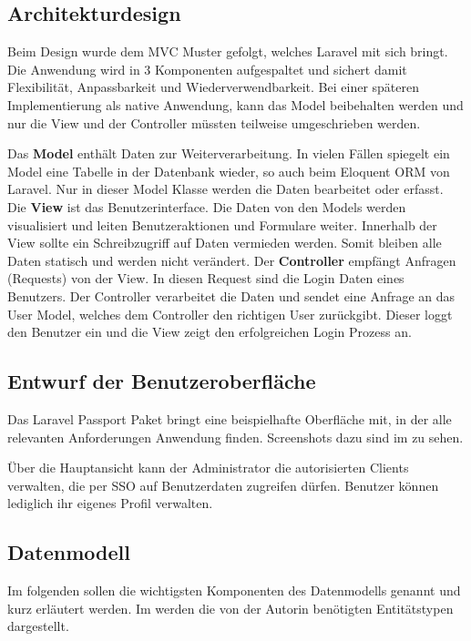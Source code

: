 \subsection{Architekturdesign}
\label{sec:Architekturdesign}

Beim Design wurde dem \ac{MVC} Muster gefolgt, welches Laravel mit sich bringt. Die Anwendung wird in 3 Komponenten aufgespaltet und sichert damit Flexibilität, Anpassbarkeit und Wiederverwendbarkeit.
Bei einer späteren Implementierung als native Anwendung, kann das Model beibehalten werden und nur die View und der Controller müssten teilweise umgeschrieben werden.

Das \textbf{Model} enthält Daten zur Weiterverarbeitung. In vielen Fällen spiegelt ein Model eine Tabelle in der Datenbank wieder, so auch beim Eloquent \ac{ORM} von Laravel. Nur in dieser Model Klasse werden die Daten bearbeitet oder erfasst. 
Die \textbf{View} ist das Benutzerinterface. Die Daten von den Models werden visualisiert und leiten \zB Benutzeraktionen und Formulare weiter. Innerhalb der View sollte ein Schreibzugriff auf Daten vermieden werden. Somit bleiben alle Daten statisch und werden nicht verändert.
Der \textbf{Controller} empfängt Anfragen (Requests) von der View. In diesen Request sind \bspw die Login Daten eines Benutzers. Der Controller verarbeitet die Daten und sendet eine Anfrage an das User Model, welches dem Controller den richtigen User zurückgibt. Dieser loggt den Benutzer ein und die View zeigt den erfolgreichen Login Prozess an. 

\subsection{Entwurf der Benutzeroberfläche}
\label{sec:Benutzeroberflaeche} 

Das Laravel Passport Paket bringt eine beispielhafte Oberfläche mit, in der alle relevanten Anforderungen Anwendung finden. Screenshots dazu sind im  zu sehen.

Über die Hauptansicht kann der Administrator die autorisierten Clients verwalten, die per \ac{SSO} auf  Benutzerdaten zugreifen dürfen. Benutzer können lediglich ihr eigenes Profil verwalten.

\subsection{Datenmodell}
\label{sec:Datenmodell}

Im folgenden sollen die wichtigsten Komponenten des Datenmodells genannt und kurz erläutert werden. Im  werden die von der Autorin benötigten Entitätstypen dargestellt. 

